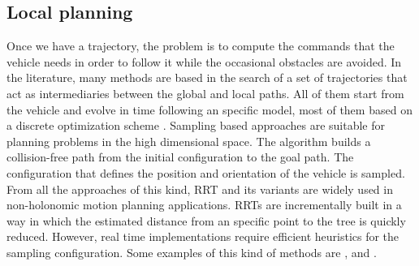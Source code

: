 \subsection{Local planning}\label{ch:chapter00_02_07}

Once we have a trajectory, the problem is to compute the commands that the vehicle needs in order to follow it while the occasional obstacles are avoided. In the literature, many methods are based in the search of a set of trajectories that act as intermediaries between the global and local paths. All of them start from the vehicle and evolve in time following an specific model, most of them based on a discrete optimization scheme \citep{thrun2006stanley, montemerlo2008junior, werling2010optimal, ferguson2008motion}.
Sampling based approaches are suitable for planning problems in the high dimensional space. The algorithm builds a collision-free path from the initial configuration to the goal path. The configuration that defines the position and orientation of the vehicle is sampled. From all the approaches of this kind, \ac{RRT} and its variants are widely used in non-holonomic motion planning applications.
\acp{RRT} are incrementally built in a way in which the estimated distance from an specific point to the tree is quickly reduced. However, real time implementations require efficient heuristics for the sampling configuration. 
Some examples of this kind of methods are \cite{van1997real}, \cite{lavalle2001randomized} and \cite{kuwata2009real}.

